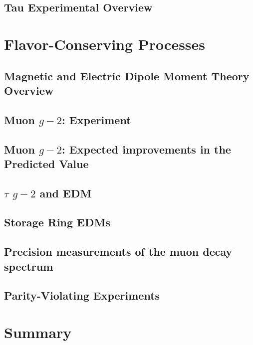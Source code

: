 
\subsection{Tau Experimental Overview}\label{sec:cl:tauexp}

%


\section{Flavor-Conserving Processes}\label{sec:cl:fcp}

\subsection{ Magnetic and Electric Dipole Moment Theory Overview}\label{sec:cl:fct}


\subsection{Muon $g-2$:  Experiment}


\subsection{Muon $g-2$:  Expected improvements in the Predicted Value}


\subsection{$\tau$ $g-2$ and EDM}

\subsection{Storage Ring EDMs}


\subsection{Precision measurements of the muon decay spectrum}


\subsection{Parity-Violating Experiments}\label{sec:cl:pve}


\section{Summary}\label{sec:cl:gm2edmdisc}





